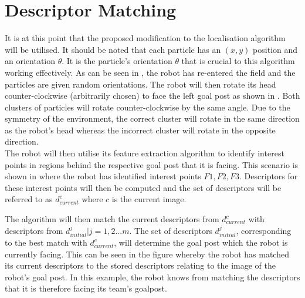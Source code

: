 \section{Descriptor Matching}
\label{sec:disambiguation}
It is at this point that the proposed modification to the localisation algorithm will be utilised. It should be noted that each particle has an $(x,y)$ position and an orientation $\theta$. It is the particle's orientation $\theta$ that is crucial to this algorithm working effectively. As can be seen in , the robot has re-entered the field and the particles are given random orientations. The robot will then rotate its head counter-clockwise (arbitrarily chosen) to face the left goal post as shown in . Both clusters of particles will rotate counter-clockwise by the same angle. Due to the symmetry of the environment, the correct cluster will rotate in the same direction as the robot's head whereas the incorrect cluster will rotate in the opposite direction.\\

The robot will then utilise its feature extraction algorithm to identify interest points in regions behind the respective goal post that it is facing. This scenario is shown in  where the robot has identified interest points $F1, F2, F3$. Descriptors for these interest points will then be computed and the set of descriptors will be referred to as $d_{current}^c$ where $c$ is the current image.

The algorithm will then match the current descriptors from $d_{current}^c$ with descriptors from $d_{initial}^j|j=1,2...m$. The set of descriptors $d_{initial}^j$, corresponding to the best match with $d_{current}^c$, will determine the goal post which the robot is currently facing. This can be seen in the figure whereby the robot has matched its current descriptors to the stored descriptors relating to the image of the robot's goal post. In this example, the robot knows from matching the descriptors that it is therefore facing its team's goalpost.\\
 
